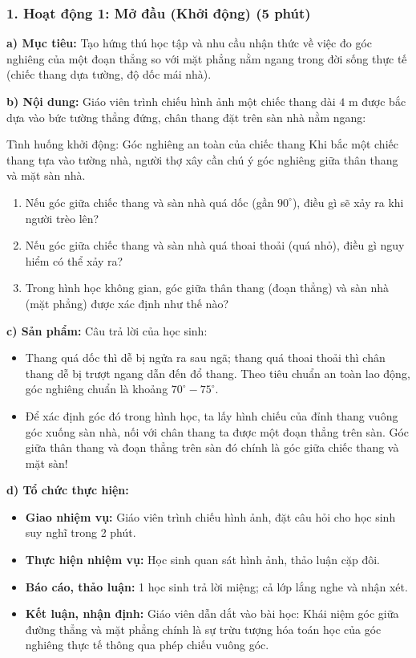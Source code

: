 \documentclass[12pt, a4paper]{article}
\begin{document}
\subsubsection*{1. Hoạt động 1: Mở đầu (Khởi động) (5 phút)}

\noindent \textbf{a) Mục tiêu:}
Tạo hứng thú học tập và nhu cầu nhận thức về việc đo góc nghiêng của một đoạn thẳng so với mặt phẳng nằm ngang trong đời sống thực tế (chiếc thang dựa tường, độ dốc mái nhà).

\noindent \textbf{b) Nội dung:}
Giáo viên trình chiếu hình ảnh một chiếc thang dài $4\text{ m}$ được bắc dựa vào bức tường thẳng đứng, chân thang đặt trên sàn nhà nằm ngang:
\begin{pedabox}{Tình huống khởi động: Góc nghiêng an toàn của chiếc thang}
Khi bắc một chiếc thang tựa vào tường nhà, người thợ xây cần chú ý góc nghiêng giữa thân thang và mặt sàn nhà.
\begin{enumerate}[leftmargin=0.6cm]
    \item Nếu góc giữa chiếc thang và sàn nhà quá dốc (gần $90^\circ$), điều gì sẽ xảy ra khi người trèo lên?
    \item Nếu góc giữa chiếc thang và sàn nhà quá thoai thoải (quá nhỏ), điều gì nguy hiểm có thể xảy ra?
    \item Trong hình học không gian, góc giữa thân thang (đoạn thẳng) và sàn nhà (mặt phẳng) được xác định như thế nào?
\end{enumerate}
\end{pedabox}

\noindent \textbf{c) Sản phẩm:}
Câu trả lời của học sinh:
\begin{itemize}
    \item Thang quá dốc thì dễ bị ngửa ra sau ngã; thang quá thoai thoải thì chân thang dễ bị trượt ngang dẫn đến đổ thang. Theo tiêu chuẩn an toàn lao động, góc nghiêng chuẩn là khoảng $70^\circ - 75^\circ$.
    \item Để xác định góc đó trong hình học, ta lấy hình chiếu của đỉnh thang vuông góc xuống sàn nhà, nối với chân thang ta được một đoạn thẳng trên sàn. Góc giữa thân thang và đoạn thẳng trên sàn đó chính là góc giữa chiếc thang và mặt sàn!
\end{itemize}

\noindent \textbf{d) Tổ chức thực hiện:}
\begin{itemize}[leftmargin=0.6cm]
    \item \textbf{Giao nhiệm vụ:} Giáo viên trình chiếu hình ảnh, đặt câu hỏi cho học sinh suy nghĩ trong 2 phút.
    \item \textbf{Thực hiện nhiệm vụ:} Học sinh quan sát hình ảnh, thảo luận cặp đôi.
    \item \textbf{Báo cáo, thảo luận:} 1 học sinh trả lời miệng; cả lớp lắng nghe và nhận xét.
    \item \textbf{Kết luận, nhận định:} Giáo viên dẫn dắt vào bài học: Khái niệm góc giữa đường thẳng và mặt phẳng chính là sự trừu tượng hóa toán học của góc nghiêng thực tế thông qua phép chiếu vuông góc.
\end{itemize}
\end{document}
